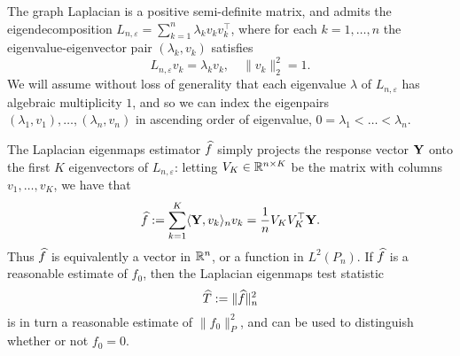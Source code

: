 The graph Laplacian is a positive semi-definite matrix, and admits the eigendecomposition $L_{n,\varepsilon} = \sum_{k = 1}^{n} \lambda_k v_k v_k^{\top}$, where for each $k = 1,\ldots,n$ the eigenvalue-eigenvector pair $(\lambda_k,v_k)$ satisfies
\begin{equation*}
L_{n,\varepsilon}v_k = \lambda_k v_k, \quad \|v_k\|_2^2 = 1.
\end{equation*}
We will assume without loss of generality that each eigenvalue $\lambda$ of $L_{n,\varepsilon}$ has algebraic multiplicity $1$, and so we can index the eigenpairs $(\lambda_1,v_1),\ldots,(\lambda_n,v_n)$ in ascending order of eigenvalue, $0 = \lambda_1 < \ldots < \lambda_n$. 

The Laplacian eigenmaps estimator $\widehat{f}$ simply projects the response vector ${\bf Y}$ onto the first $K$ eigenvectors of $L_{n,\varepsilon}$: letting $V_K \in \mathbb{R}^{n \times K}$ be the matrix with columns $v_1,\ldots,v_K$, we have that
\begin{equation}
\label{eqn:laplacian_eigenmaps_estimator}
\widehat{f} := \sum_{k = 1}^{K} \langle {\bf Y}, v_k \rangle_{n} v_k = \frac{1}{n} V_K V_K^{\top} {\bf Y}.
\end{equation} 
Thus $\widehat{f}$ is equivalently a vector in $\mathbb{R}^n$, or a function in $L^2(P_n)$. If $\widehat{f}$ is a reasonable estimate of $f_0$, then the Laplacian eigenmaps test statistic
\begin{equation}
\label{eqn:laplacian_eigenmaps_test}
\widehat{T} := \|\widehat{f}\|_n^2
\end{equation}
is in turn a reasonable estimate of $\|f_0\|_{P}^2$, and can be used to distinguish whether or not $f_0 = 0$.


